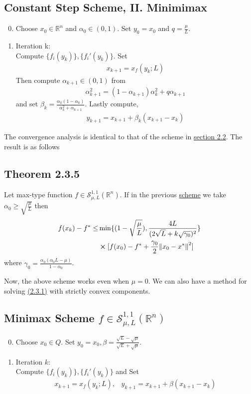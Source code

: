 \documentclass[12pt,a4paper]{article}
\begin{document}
	\subsection*{Constant Step Scheme, II. Minimimax}\label{sec:mmscheme2}
	\begin{enumerate}
		\setcounter{enumi}{-1}
		\item Choose $x_0 \in \mathbb{R}^n$ and $\alpha_0 \in (0,1)$. Set $y_0 = x_0$ and $q = \frac{\mu}{L}$.
		\item Iteration k:\\
		Compute $\{f_i(y_k)\}, \{f_i'(y_k)\}$. Set
		\begin{align*}
			x_{k+1} = x_f(y_k;L)
		\end{align*}
		Then compute $\alpha_{k+1} \in (0,1)$ from
		\begin{align*}
			\alpha_{k+1}^2 = (1 - \alpha_{k+1})\alpha_k^2 + q\alpha_{k+1}
		\end{align*}
		and set $\beta_k = \frac{\alpha_k(1 - \alpha_k)}{\alpha_k^2 + \alpha_{k+1}}$. 
		Lastly compute,
		\begin{align*}
			y_{k+1} = x_{k+1} + \beta_k(x_{k+1} - x_k)
		\end{align*}
	\end{enumerate}
	 The convergence analysis is identical to that of the scheme in  \hyperref[sec22optvar2]{section 2.2}. The result is as follows
	 \subsection*{Theorem 2.3.5}\label{thm235}
	 Let max-type function $f \in \mathcal{S}_{\mu,L}^{1,1}(\mathbb{R}^n)$. If in the previous  \hyperref[sec:mmscheme2]{scheme} we take $\alpha_0 \geq \sqrt{\frac{\mu}{L}}$ then
	 \begin{align*}
	 	f(x_k) - f^* \leq &\min \{(1 - \sqrt{\frac{\mu}{L}}), \frac{4L}{(2\sqrt{L} + k\sqrt{\gamma_0})^2}\} \\
	 	&\cross [f(x_0) - f^* + \frac{\gamma_0}{2}\norm{x_0 - x^*}^2]
	 \end{align*}
	 where $\gamma_0 = \frac{\alpha_0(\alpha_0L - \mu)}{1 - \alpha_0}$.
	 
	 Now, the above scheme works even when $\mu=0$. We can also have a method for solving \hyperref[minimax23]{(2.3.1)} with strictly convex components.
	 \subsection*{Minimax Scheme $f \in \mathcal{S}_{\mu,L}^{1,1}(\mathbb{R}^n)$}\label{sec:mmschemestrict}
	 \begin{enumerate}
	 	\setcounter{enumi}{-1}
	 	\item Choose $x_0 \in Q$. Set $y_0 = x_0, \beta = \frac{\sqrt{L} - \sqrt{\mu}}{\sqrt{L} + \sqrt{\mu}}$.
	 	\item Iteration $k$:\\
	 	Compute $\{f_i(y_k)\}, \{f_i'(y_k)\}$ and Set
	 	\begin{align*}
	 		x_{k+1} = x_f(y_k;L), \hspace{10pt} y_{k+1} = x_{k+1} + \beta(x_{k+1} - x_k)
	 	\end{align*}
	 \end{enumerate}
\end{document}

